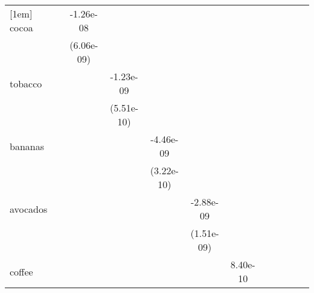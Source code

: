 \begin{table}[htbp]
\begin{tabular}{l*{11}{c}}
[1em]
cocoa       &                     &   -1.26e-08\sym{*}  &                     &                     &                     &                     &                     &                     &                     &                     &                     \\
            &                     &  (6.06e-09)         &                     &                     &                     &                     &                     &                     &                     &                     &                     \\
[1em]
tobacco     &                     &                     &   -1.23e-09\sym{*}  &                     &                     &                     &                     &                     &                     &                     &                     \\
            &                     &                     &  (5.51e-10)         &                     &                     &                     &                     &                     &                     &                     &                     \\
[1em]
bananas     &                     &                     &                     &   -4.46e-09\sym{***}&                     &                     &                     &                     &                     &                     &                     \\
            &                     &                     &                     &  (3.22e-10)         &                     &                     &                     &                     &                     &                     &                     \\
[1em]
avocados    &                     &                     &                     &                     &   -2.88e-09         &                     &                     &                     &                     &                     &                     \\
            &                     &                     &                     &                     &  (1.51e-09)         &                     &                     &                     &                     &                     &                     \\
[1em]
coffee      &                     &                     &                     &                     &                     &    8.40e-10         &                     &                     &                     &                     &                     \\

\end{tabular}
\end{table}
